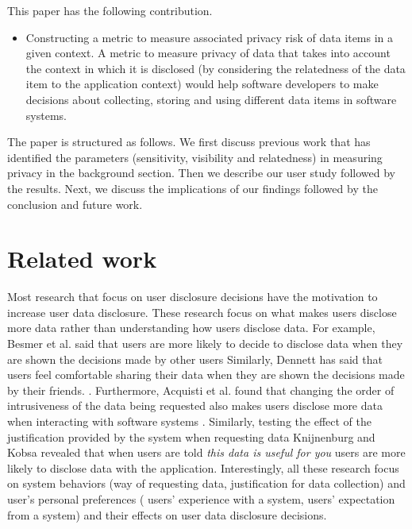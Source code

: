 \documentclass[conference]{IEEEtran}
\begin{document}
This paper has the following contribution.

\begin{itemize}
\item Constructing a metric to measure associated privacy risk of data items in a given context. A metric to measure privacy of data that takes into account the context in which it is disclosed (by considering the relatedness of the data item to the application context) would help software developers to make decisions about collecting, storing and using different data items in software systems. 
\end{itemize}

The paper is structured as follows. We first discuss previous work that has identified the parameters (sensitivity, visibility and relatedness) in measuring privacy in the background section. Then we describe our user study followed by the results. Next, we discuss the implications of our findings followed by the conclusion and future work.

\section {Related work}

Most research that focus on user disclosure decisions have the motivation to increase user data disclosure. These research focus on what makes users disclose more data rather than understanding how users disclose data. For example, Besmer et al. said that users are more likely to decide to disclose data when they are shown the decisions made by other users \cite {besmer2010impact} Similarly, Dennett has said that users feel comfortable sharing their data when they are shown the decisions made by their friends. \cite {dennett2000little}. Furthermore, Acquisti et al. found that changing the order of intrusiveness of the data being requested also makes users disclose more data when interacting with software systems \cite {acquisti2012impact}. Similarly, testing the effect of the justification provided by the system when requesting data Knijnenburg and Kobsa \cite {knijnenburg2013helping} revealed that when users are told \textit{this data is useful for you} users are more likely to disclose data with the application. Interestingly, all these research focus on system behaviors (way of requesting data, justification for data collection) and user's personal preferences ( users' experience with a system, users' expectation from a system) and their effects on user data disclosure decisions.
\end{document}
